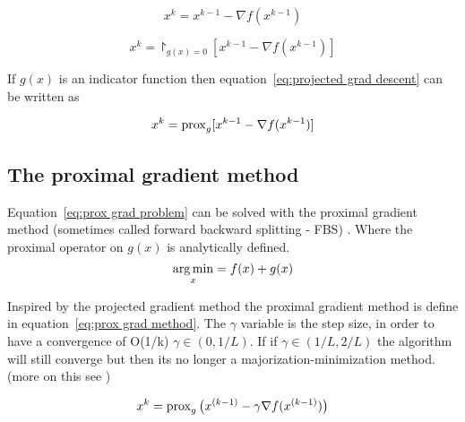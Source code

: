 		\begin{equation}
			x^k = x^{k-1} - \nabla f(x^{k-1})
			\label{eq:grad descent}
		\end{equation}
		
		\begin{equation}
			x^k = \project_{g(x)=0}[ x^{k-1} - \nabla f(x^{k-1})]
			\label{eq:projected grad descent}
		\end{equation}
		
		If $g(x)$ is an indicator function then  equation~\ref{eq:projected grad descent} can be written as 
		
		\begin{equation}
				x^k = \operatorname{prox}_{g}[ x^{k-1} - \nabla f(x^{k-1})]
			\label{eq:proximal grad descent}
		\end{equation}
	
	\subsection{The proximal gradient method}
		Equation~\ref{eq:prox grad problem} can be solved with the proximal gradient method (sometimes called forward backward splitting - FBS) . Where the proximal operator on $g(x)$ is analytically defined. 
			\begin{equation}
			\underset{x}{\operatorname*{arg\,min}} = f(x) + g(x)
			\label{eq:prox grad problem}
			\end{equation}
		
		Inspired by the projected gradient method the proximal gradient method is define in equation~\ref{eq:prox grad method}. The $\gamma$ variable is the step size, in order to have a convergence of O(1/k) $\gamma \in(0,1/L)$. If if $\gamma \in (1/L,2/L)$ the algorithm will still converge but then its no longer a majorization-minimization
		method. (more on this see \cite{NealParikh})
		
		\begin{equation}
			x^k = \operatorname{prox}_{g}\big( x^{(k-1)}- \gamma \nabla f(x^{(k-1)})\big)
			\label{eq:prox grad method}
		\end{equation}	
	
